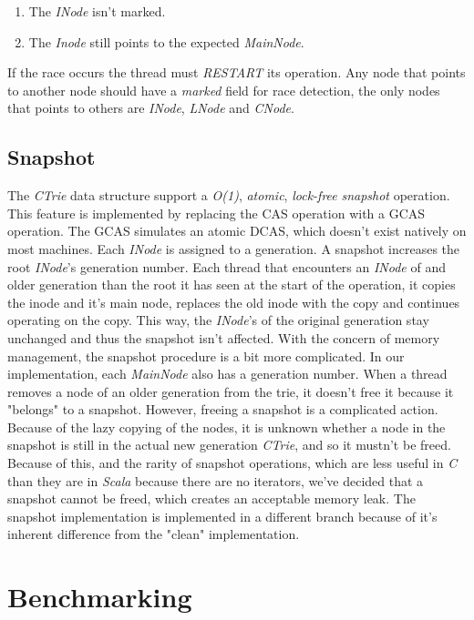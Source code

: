 \documentclass[conference]{IEEEtran}
\begin{document}
	\begin{enumerate}
		\item The \textit{INode} isn't marked.
		\item The \textit{Inode} still points to the expected \textit{MainNode}.		
	\end{enumerate}
	If the race occurs the thread must \textit{RESTART} its operation. Any node that points to another node should have a \textit{marked} field for race detection, the only nodes that points to others are \textit{INode}, \textit{LNode} and \textit{CNode}.
	
\subsection{Snapshot}
	The \textit{CTrie} data structure support a \textit{O(1)}, \textit{atomic}, \textit{lock-free} \textit{snapshot} operation. This feature is implemented by replacing the CAS operation with a GCAS operation. The GCAS simulates an atomic DCAS, which doesn't exist natively on most machines. Each \textit{INode} is assigned to a generation. A snapshot increases the root \textit{INode}'s generation number. Each thread that encounters an \textit{INode} of and older generation than the root it has seen at the start of the operation, it copies the inode and it's main node, replaces the old inode with the copy and continues operating on the copy. This way, the \textit{INode}'s of the original generation stay unchanged and thus the snapshot isn't affected. 
	With the concern of memory management, the snapshot procedure is a bit more complicated. In our implementation, each \textit{MainNode} also has a generation number. When a thread removes a node of an older generation from the trie, it doesn't free it because it "belongs" to a snapshot. However, freeing a snapshot is a complicated action. Because of the lazy copying of the nodes, it is unknown whether a node in the snapshot is still in the actual new generation \textit{CTrie}, and so it mustn't be freed. Because of this, and the rarity of snapshot operations, which are less useful in \textit{C} than they are in \textit{Scala} because there are no iterators, we've decided that a snapshot cannot be freed, which creates an acceptable memory leak.
	The snapshot implementation\cite{snapshot-cictrie} is implemented in a different branch because of it's inherent difference from the "clean" implementation.

\section{Benchmarking}
\end{document}

